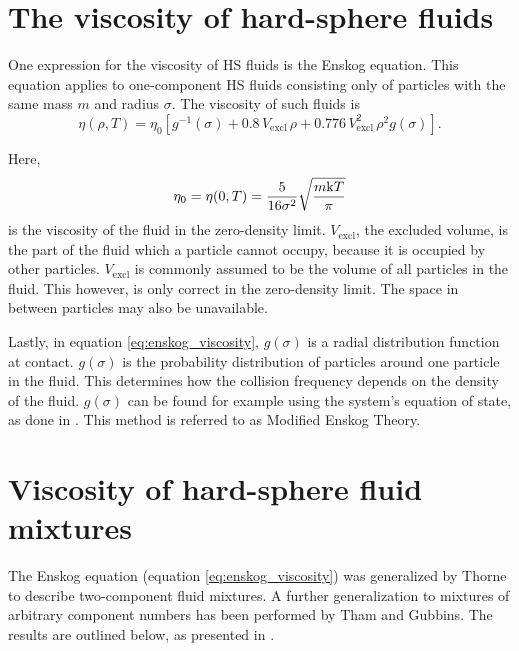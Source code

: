 \section{The viscosity of hard-sphere fluids}
One expression for the viscosity of HS fluids 
is the Enskog equation. This equation applies 
to one-component HS fluids consisting only of 
particles with the same mass $m$ and radius 
$\sigma$. The viscosity of such fluids is 
\cite{ref:pippo:composition_dependence}
\[
    \label{eq:enskog_viscosity}
    \eta(\rho,T) 
        = \eta_0 \left[g^{-1}(\sigma) 
        + 0.8\, V_{\text{excl}}\,\rho 
        + 0.776 \,V_{\text{excl}}^2 \,\rho^2 g(\sigma) 
        \right].
\]
\iffalse
\[
    \begin{split}
        \eta(n,T)
            &= \frac{\eta^0}{\chi} (1+\frac{1}{2} \alpha \chi n)^2 
            + \frac{3}{5} \bar{\omega}, \quad \text{where}\\
        \alpha
            &= \frac{8}{15} \pi \sigma^3, \quad \text{and} \\
        \bar{\omega}
            &= \frac{4}{9} n^2 \sigma^4 \chi \sqrt{\pi m \kB T}.
    \end{split}
\]
\fi
Here, 
\[
    \eta_0 = \eta(0, T) = 
    \frac{5}{16\sigma^2} \sqrt{\frac{m \mathrm{k} T}{\pi}}
\]
is the viscosity of the fluid in the zero-density 
limit. $V_{\text{excl}}$, the excluded volume, 
is the part of the fluid which a particle cannot 
occupy, because it is occupied by other particles. 
$V_{\text{excl}}$ is commonly assumed to be the 
volume of all particles in the fluid. This however, 
is only correct in the zero-density limit. 
The space in between particles may also be unavailable.

Lastly, in equation \eqref{eq:enskog_viscosity}, 
$g(\sigma)$ is a radial distribution function at 
contact.  $g(\sigma)$ is the probability distribution 
of particles around one particle in the fluid. 
This determines how the collision frequency depends 
on the density of the fluid. $g(\sigma)$ can be 
found for example using the system's equation of 
state, as done in \cite{ref:pippo:composition_dependence}.
This method is referred to as Modified Enskog Theory.



\section{Viscosity of hard-sphere fluid mixtures}
The Enskog equation (equation \eqref{eq:enskog_viscosity}) 
was generalized by Thorne to describe two-component fluid 
mixtures\cite{ref:chapman:non_uniform_gases}.
A further generalization to mixtures of arbitrary 
component numbers has been performed by Tham and 
Gubbins\cite{ref:tham:fluid_mixtures}. The results 
are outlined below, as presented in 
\cite{ref:pippo:composition_dependence}.

